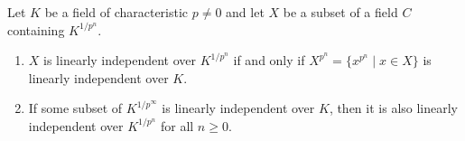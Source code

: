 Let $K$ be a field of characteristic $p \neq 0$ and let $X$ be a subset of a field $C$ containing $K^{1/p^n}$.
\begin{enumerate}
\item[(i)] $X$ is linearly independent over $K^{1/p^n}$ if and only if $X^{p^n} = \{x^{p^n} \mid x \in X\}$ is linearly independent over $K$.
\item[(ii)] If some subset of $K^{1/p^\infty}$ is linearly independent over $K$, then it is also linearly independent over $K^{1/p^n}$ for all $n \geq 0$.
\end{enumerate}
